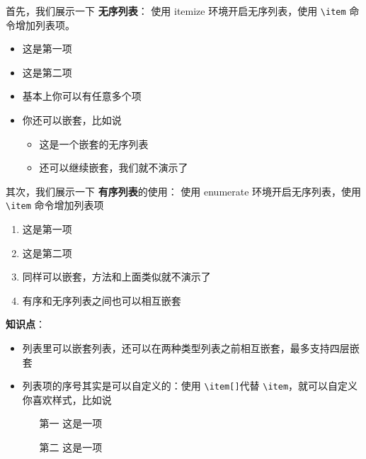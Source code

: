 \vspace{1em} %

首先，我们展示一下 \textbf{无序列表}：
使用 itemize 环境开启无序列表，使用 \verb|\item| 命令增加列表项。

\begin{itemize}
    \item 这是第一项
    \item 这是第二项
    \item 基本上你可以有任意多个项
    \item 你还可以嵌套，比如说
    \begin{itemize}
        \item 这是一个嵌套的无序列表
        \item 还可以继续嵌套，我们就不演示了
    \end{itemize}
\end{itemize}

\vspace{1em} %

其次，我们展示一下 \textbf{有序列表}的使用：
使用 enumerate 环境开启无序列表，使用 \verb|\item| 命令增加列表项

\begin{enumerate}
    \item 这是第一项
    \item 这是第二项
    \item 同样可以嵌套，方法和上面类似就不演示了
    \item 有序和无序列表之间也可以相互嵌套
\end{enumerate}

\vspace{1em}

\textbf{知识点}：
\begin{itemize}
    \item 列表里可以嵌套列表，还可以在两种类型列表之前相互嵌套，最多支持四层嵌套
    \item 列表项的序号其实是可以自定义的：使用 \verb|\item[]|代替 \verb|\item|，就可以自定义你喜欢样式，比如说
        \begin{enumerate}
            \item[第一] 这是一项
            \item[第二] 这是一项
        \end{enumerate}
\end{itemize}


